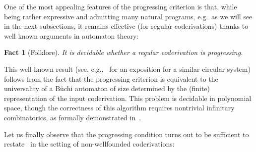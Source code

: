 \documentclass[manuscript,screen]{acmart}
\newtheorem{fact}[thm]{Fact}
\theoremstyle{definition}
\theoremstyle{remark}
\begin{document}
One of the most appealing features of the progressing criterion is that, while being rather expressive and admitting many natural programs, e.g.~as we will see in the next subsections, it remains effective (for regular coderivations) thanks to well known arguments in automaton theory:

\begin{fact}[Folklore]
 It is decidable whether a regular coderivation is progressing.
\end{fact}
This well-known result (see, e.g.,~\cite{DaxHL06} for an exposition for a similar circular system) follows from the fact that the progressing criterion is equivalent to the universality of a  B\"{u}chi automaton of size determined by the (finite) representation of the input coderivation. This problem is decidable in polynomial space, though the correctness of this algorithm requires nontrivial infinitary combinatorics, as formally demonstrated in~\cite{KolodziejczykMP19}. 


Let us finally observe that the progressing condition turns out to be sufficient to restate~ in the setting of  non-wellfounded coderivations:
\end{document}
